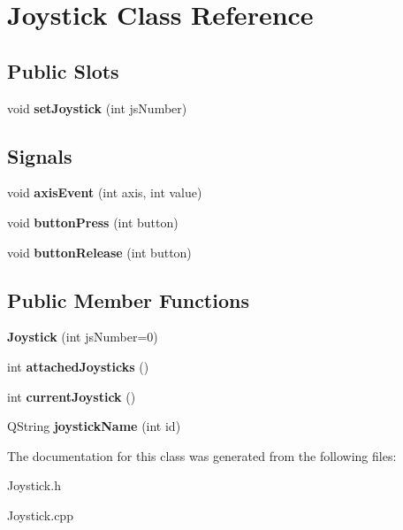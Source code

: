 \hypertarget{classJoystick}{
\section{Joystick Class Reference}
\label{classJoystick}
}
\subsection*{Public Slots}
\begin{DoxyCompactItemize}
\item 
\hypertarget{classJoystick_ac21f550cff6a9af720b4715245bc438c}{
void {\bfseries setJoystick} (int jsNumber)}
\label{classJoystick_ac21f550cff6a9af720b4715245bc438c}

\end{DoxyCompactItemize}
\subsection*{Signals}
\begin{DoxyCompactItemize}
\item 
\hypertarget{classJoystick_a15d462e094d9e18351f5540a36ef15e7}{
void {\bfseries axisEvent} (int axis, int value)}
\label{classJoystick_a15d462e094d9e18351f5540a36ef15e7}

\item 
\hypertarget{classJoystick_a46376f5ce1775b4eb4f9fcc17b3bdf56}{
void {\bfseries buttonPress} (int button)}
\label{classJoystick_a46376f5ce1775b4eb4f9fcc17b3bdf56}

\item 
\hypertarget{classJoystick_aca6f2ccbbcf2cb729f7ede6e8b8c663c}{
void {\bfseries buttonRelease} (int button)}
\label{classJoystick_aca6f2ccbbcf2cb729f7ede6e8b8c663c}

\end{DoxyCompactItemize}
\subsection*{Public Member Functions}
\begin{DoxyCompactItemize}
\item 
\hypertarget{classJoystick_aa6fbd1e6762cb4e6fb022f7a40582ba5}{
{\bfseries Joystick} (int jsNumber=0)}
\label{classJoystick_aa6fbd1e6762cb4e6fb022f7a40582ba5}

\item 
\hypertarget{classJoystick_a7ae4cfe375bb5af47e2d36837cd00ecb}{
int {\bfseries attachedJoysticks} ()}
\label{classJoystick_a7ae4cfe375bb5af47e2d36837cd00ecb}

\item 
\hypertarget{classJoystick_a5a93a690ab3c80b7dc0f0157e1ebd1e4}{
int {\bfseries currentJoystick} ()}
\label{classJoystick_a5a93a690ab3c80b7dc0f0157e1ebd1e4}

\item 
\hypertarget{classJoystick_a973edcde9f8e357b47fc5c126960442b}{
QString {\bfseries joystickName} (int id)}
\label{classJoystick_a973edcde9f8e357b47fc5c126960442b}

\end{DoxyCompactItemize}


The documentation for this class was generated from the following files:\begin{DoxyCompactItemize}
\item 
Joystick.h\item 
Joystick.cpp\end{DoxyCompactItemize}
